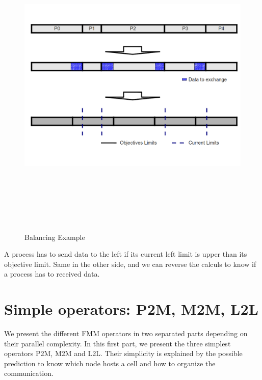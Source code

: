 \documentclass[12pt,letterpaper,titlepage]{report}
\begin{document}
\begin{figure}[h!]
\begin{center}
\includegraphics[width=15cm, height=15cm, keepaspectratio=true]{Balance.png}
\caption{Balancing Example}
\end{center}
\end{figure}

A process has to send data to the left if its current left limit is upper than its objective limit.
Same in the other side, and we can reverse the calculs to know if a process has to received data.

\chapter{Simple operators: P2M, M2M, L2L}
We present the different FMM operators in two separated parts depending on their parallel complexity.
In this first part, we present the three simplest operators P2M, M2M and L2L.
Their simplicity is explained by the possible prediction to know which node hosts a cell and how to organize the communication.
\end{document}
